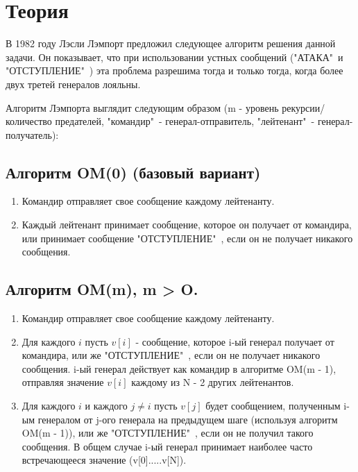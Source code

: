 \documentclass[12pt,a4paper]{article}
\begin{document}
	\section{Теория}
            В 1982 году Лэсли Лэмпорт предложил следующее алгоритм решения данной задачи.
            Он показывает, что при использовании устных сообщений ("АТАКА"\ и "ОТСТУПЛЕНИЕ"\ ) эта проблема разрешима тогда и только тогда, когда более двух третей генералов лояльны.

            Алгоритм Лэмпорта выглядит следующим образом (m - уровень рекурсии/количество предателей, "командир"\ - генерал-отправитель, "лейтенант"\ - генерал-получатель):
            
            \subsection{Алгоритм OM(0) (базовый вариант)}
            \begin{enumerate}
                \item Командир отправляет свое сообщение каждому лейтенанту.
                \item Каждый лейтенант принимает сообщение, которое он получает от командира, или принимает сообщение "ОТСТУПЛЕНИЕ"\ ,  если он не получает никакого сообщения.
            \end{enumerate}
            
            \subsection{Алгоритм OM(m), m > O.}
            \begin{enumerate}
                \item Командир отправляет свое сообщение каждому лейтенанту.
                \item Для каждого $i$ пусть $v[i]$ - сообщение, которое i-ый генерал получает от командира, или же "ОТСТУПЛЕНИЕ"\ , если он не получает никакого сообщения. i-ый генерал действует как командир в алгоритме OM(m - 1), отправляя значение $v[i]$ каждому из N - 2 других лейтенантов.
                \item Для каждого $i$ и каждого $j \neq i$ пусть $v[j]$ будет сообщением, полученным i-ым генералом от j-ого генерала на предыдущем шаге (используя алгоритм OM(m - 1)), или же "ОТСТУПЛЕНИЕ"\ , если он не получил такого сообщения. В общем случае i-ый генерал принимает наиболее часто встречающееся значение (v[0].....v[N]).
            \end{enumerate}
            
\end{document}
